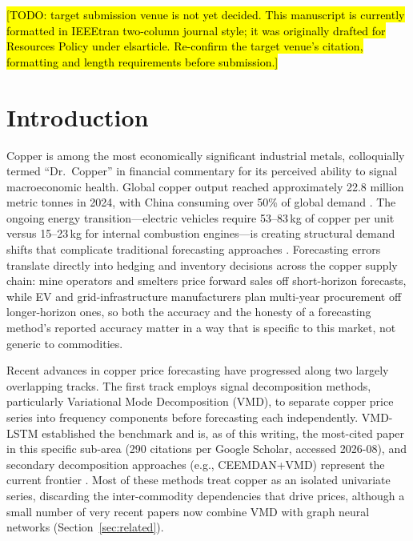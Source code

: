 \documentclass[journal]{IEEEtran}
\newcommand{\todohl}[1]{\hl{#1}}
\begin{document}
\maketitle
\IEEEdisplaynontitleabstractindextext
\IEEEpeerreviewmaketitle

\noindent\todohl{[TODO: target submission venue is not yet decided. This
manuscript is currently formatted in IEEEtran two-column journal style; it was
originally drafted for Resources Policy under elsarticle. Re-confirm the target
venue's citation, formatting and length requirements before submission.]}

\section{Introduction}
\label{sec:intro}

Copper is among the most economically significant industrial metals, colloquially termed ``Dr.\ Copper'' in financial commentary for its perceived ability to signal macroeconomic health. Global copper output reached approximately 22.8 million metric tonnes in 2024, with China consuming over 50\% of global demand \citep{IEA2024}. The ongoing energy transition---electric vehicles require 53--83\,kg of copper per unit versus 15--23\,kg for internal combustion engines---is creating structural demand shifts that complicate traditional forecasting approaches \citep{IEA2024}. Forecasting errors translate directly into hedging and inventory decisions across the copper supply chain: mine operators and smelters price forward sales off short-horizon forecasts, while EV and grid-infrastructure manufacturers plan multi-year procurement off longer-horizon ones, so both the accuracy and the honesty of a forecasting method's reported accuracy matter in a way that is specific to this market, not generic to commodities.

Recent advances in copper price forecasting have progressed along two largely overlapping tracks. The first track employs signal decomposition methods, particularly Variational Mode Decomposition (VMD), to separate copper price series into frequency components before forecasting each independently. VMD-LSTM \citep{Liu2020} established the benchmark and is, as of this writing, the most-cited paper in this specific sub-area (290 citations per Google Scholar, accessed 2026-08), and secondary decomposition approaches (e.g., CEEMDAN+VMD) represent the current frontier \citep{Zhang2025a, ZhangKe2025}. Most of these methods treat copper as an isolated univariate series, discarding the inter-commodity dependencies that drive prices, although a small number of very recent papers now combine VMD with graph neural networks (Section~\ref{sec:related}).
\end{document}
